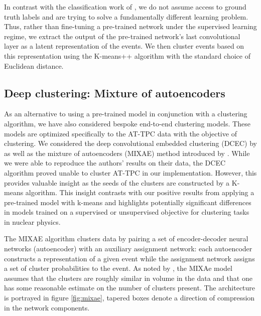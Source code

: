 \documentclass[review,number,sort&compress]{elsarticle}
\begin{document}

In contrast with the classification work of \citet{Kuchera2019}, we do not assume access to ground truth labels and are trying to solve a fundamentally different learning problem. Thus, rather than fine-tuning a pre-trained network under the supervised learning regime, we extract the output of the pre-trained network's last convolutional layer as a latent representation of the events. We then cluster events based on this representation using the K-means++ algorithm with the standard choice of Euclidean distance.


\subsection{Deep clustering: Mixture of autoencoders}\label{sec:mixae}

As an alternative to using a pre-trained model in conjunction with a clustering algorithm, we have also considered bespoke end-to-end clustering models. These models are optimized specifically to the AT-TPC data with the objective of clustering. We considered the deep convolutional embedded clustering (DCEC) by \citet{Guo2017} as well as the mixture of autoencoders (MIXAE) method introduced by \citet{Zhang}. While we were able to reproduce the authors' results on their data, the DCEC algorithm proved unable to cluster AT-TPC in our implementation. However, this provides valuable insight as the seeds of the clusters are constructed by a K-means algorithm. This insight contrasts with our positive results from applying a pre-trained model with k-means and highlights potentially significant differences in models trained on a supervised or unsupervised objective for clustering tasks in nuclear physics. 

The MIXAE algorithm clusters data by pairing a set of encoder-decoder neural networks (autoencoder) with an auxiliary assignment network: each autoencoder constructs a representation of a given event while the assignment network assigns a set of cluster probabilities to the event. As noted by \citet{Zhang}, the MIXAe model assumes that the clusters are roughly similar in volume in the data and that one has some reasonable estimate on the number of clusters present. The architecture is portrayed in figure \ref{fig:mixae}, tapered boxes denote a direction of compression in the network components. 
\end{document}

